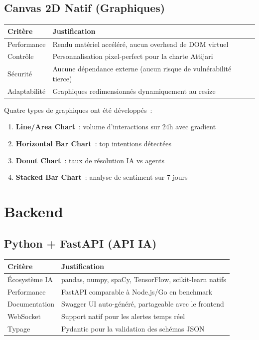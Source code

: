 \documentclass[12pt,a4paper]{report}
\begin{document}
\subsection{Canvas 2D Natif (Graphiques)}

\begin{table}[H]
\centering
\begin{tabularx}{\textwidth}{|l|X|}
\hline
\textbf{Critère} & \textbf{Justification} \\
\hline
Performance & Rendu matériel accéléré, aucun overhead de DOM virtuel \\
\hline
Contrôle & Personnalisation pixel-perfect pour la charte Attijari \\
\hline
Sécurité & Aucune dépendance externe (aucun risque de vulnérabilité tierce) \\
\hline
Adaptabilité & Graphiques redimensionnés dynamiquement au resize \\
\hline
\end{tabularx}
\end{table}

Quatre types de graphiques ont été développés~:
\begin{enumerate}[noitemsep]
    \item \textbf{Line/Area Chart}~: volume d'interactions sur 24h avec gradient
    \item \textbf{Horizontal Bar Chart}~: top intentions détectées
    \item \textbf{Donut Chart}~: taux de résolution IA vs agents
    \item \textbf{Stacked Bar Chart}~: analyse de sentiment sur 7 jours
\end{enumerate}

\section{Backend}

\subsection{Python + FastAPI (API IA)}

\begin{table}[H]
\centering
\begin{tabularx}{\textwidth}{|l|X|}
\hline
\textbf{Critère} & \textbf{Justification} \\
\hline
Écosystème IA & pandas, numpy, spaCy, TensorFlow, scikit-learn natifs \\
\hline
Performance & FastAPI comparable à Node.js/Go en benchmark \\
\hline
Documentation & Swagger UI auto-généré, partageable avec le frontend \\
\hline
WebSocket & Support natif pour les alertes temps réel \\
\hline
Typage & Pydantic pour la validation des schémas JSON \\
\hline
\end{tabularx}
\end{table}
\end{document}
